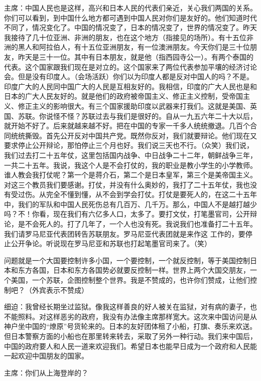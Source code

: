 主席：中国人民也是这样，高兴和日本人民的代表们亲近，关心我们两国的关系。你们可以看到，到中国什么地方都可遇到中国人民对你们是友好的。他们知道时代不同了，情况变化了。中国的情况变了，日本的情况变了，世界的情况变了。昨天我接待了几十位亚洲、非洲的朋友，也在这个地方（指接见的场所）。有十五位非洲的黑人和阿拉伯人，有十五位亚洲朋友，有一位澳洲朋友。今天你们是三十位朋友，昨天是三十一位。其中有日本朋友，就是他（指西园寺公一）。有两个泰国的代表。这个国家跟我们现在是对立的。这个国家来了两位代表参加平壤的经济讨论会。但是没有印度人。（会场活跃）你们以为印度人都是反对中国人的吗？不是。印度广大的人民同中国广大的人民是互相友好的。我相信，印度的广大人民也是和日本的广大人民友好的。就是他们的政府被帝国主义、修正主义控制，受帝国主义、修正主义的影响很大。有三个国家援助印度以武器来打我们。这就是美国、英国、苏联。你说怪不怪？苏联过去与我们是很好的。自从一九五六年二十大以后，就开始不好了。后来就越来越不好。把在中国的专家一千多人统统撤退。几百个合同统统撕毁。首先公开反对中国共产党。既然你反对，我们就要辩论。他们现在又要求停止公开辩论，那怕停止三个月也好。我们说三天也不行。（众笑）我们说，我们过去打二十五年仗，这里包括国内战争、中日战争二十二年，朝鲜战争三年，一共二十五年。我说，我这个人是不会打仗的，我的职业是教小学生的小学教师。谁人教会我打仗呢？第一个是蒋介石，第二个是日本皇军，第三个是美帝国主义。对这三个教员我们要感谢。打仗，并没有什么奥妙的，我打了二十五年仗，我也没有受过伤。从完全不懂到懂，从不会到学会打仗。打仗是要死人的，在这二十五年中，我们的军队和中国人民死伤总有几百万、几千万。那么，中国人不是越打越少吗？不！你看，现在我们有六亿多人口，太多了。要打文仗，打笔墨官司，公开辩论，是不会死人的。打了几年了，一个人也没有死。我说我们也准备打二十五年。我们请罗马尼亚代表团转告苏联朋友。罗马尼亚代表团就是来作这
工作的，要停止公开争论。听说现在罗马尼亚和苏联也打起笔墨官司来了。（笑）

问题就是一个大国要控制许多小国，一个要控制，一个就反控制，等于美国控制日本和东方各国，日本和东方各国势必就要反控制一样。世界上两个大国交朋友，一个美国，一个苏联，企图控制整个世界。我是不赞成的，也许你们赞成，让他们控制吧？（外宾表示不赞成）

细迫：我曾经长期坐过监狱。像我这样善良的好人被关在监狱，对有病的妻子，也不能照料。对这样恶劣的政府，我没有办法像主席那样宽大。这次来中国访问是从神户坐中国的“燎原”号货轮来的。日本的友好团体租了小船，打旗、奏乐来欢送。但日本警察方面的小船也在那里转来转去，采取了另外一种行动。我们来中国后，中国的政府要人和人民一道来欢迎我们。希望日本也能早日成为一个政府和人民能一起欢迎中国朋友的国家。

主席：你们从上海登岸的？


